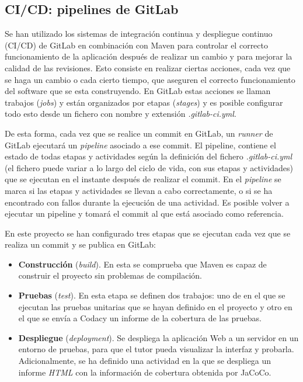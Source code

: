 \subsection{CI/CD: pipelines de GitLab}\label{sect:5_4_1_CICD}

Se han utilizado los sistemas de integración continua y despliegue continuo (CI/CD) de GitLab en combinación con Maven para controlar el correcto funcionamiento de la aplicación después de realizar un cambio y para mejorar la calidad de las revisiones. Esto consiste en realizar ciertas acciones, cada vez que se haga un cambio o cada cierto tiempo, que aseguren el correcto funcionamiento del software que se esta construyendo. En GitLab estas acciones se llaman trabajos (\textit{jobs}) y están organizados por etapas (\textit{stages}) y es posible configurar todo esto desde un fichero con nombre y extensión \textit{.gitlab-ci.yml}. 

De esta forma, cada vez que se realice un commit en GitLab, un \textit{runner} de GitLab ejecutará un \textit{pipeline} asociado a ese commit. El pipeline, contiene el estado de todas etapas y actividades según la definición del fichero \textit{.gitlab-ci.yml} (el fichero puede variar a lo largo del ciclo de vida, con sus etapas y actividades) que se ejecutan en el instante después de realizar el commit. En el \textit{pipeline} se marca si las etapas y actividades se llevan a cabo correctamente, o si se ha encontrado con fallos durante la ejecución de una actividad. Es posible volver a ejecutar un pipeline y tomará el commit al que está asociado como referencia.

En este proyecto se han configurado tres etapas que se ejecutan cada vez que se realiza un commit y se publica en GitLab:
\begin{itemize}
	\item \textbf{Construcción} (\textit{build}). En esta se comprueba que Maven es capaz de construir el proyecto sin problemas de compilación.
	\item \textbf{Pruebas} (\textit{test}). En esta etapa se definen dos trabajos: uno de en el que se ejecutan las pruebas unitarias que se hayan definido en el proyecto y otro en el que se envía a Codacy un informe de la cobertura de las pruebas.
	\item \textbf{Despliegue} (\textit{deployment}). Se despliega la aplicación Web a un servidor en un entorno de pruebas, para que el tutor pueda visualizar la interfaz y probarla. Adicionalmente, se ha definido una actividad en la que se despliega un informe \textit{HTML} con la información de cobertura obtenida por JaCoCo.
\end{itemize}

